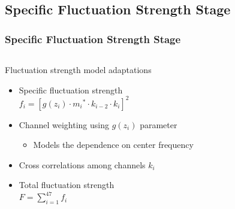 \documentclass{beamer}
\begin{document}
\subsection{Specific Fluctuation Strength Stage}
\begin{frame}
  \frametitle{Specific Fluctuation Strength Stage}
  \begin{columns}
    \begin{column}{0.5\textwidth}
      Fluctuation strength model adaptations
      \begin{itemize}
        \item<1-> Specific fluctuation strength \\
          $f_i = [g(z_i) \cdot {m_i}^* \cdot k_{i-2} \cdot k_i]^2$
        \item<2-> Channel weighting using $g(z_i)$ parameter
        \begin{itemize}
          \item<3-> Models the dependence on center frequency
        \end{itemize}
        \item<4-> Cross correlations among channels $k_i$
        \item<5-> Total fluctuation strength \\
          $F = \displaystyle\sum_{i=1}^{47} f_i$
      \end{itemize}
    \end{column}
    \begin{column}{0.5\textwidth}
\end{column}
\end{columns}
\end{frame}
\end{document}
